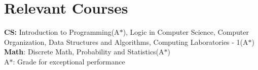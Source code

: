 \section*{Relevant Courses}

\textbf{CS:} Introduction to Programming(A$*$), Logic in Computer
Science, Computer Organization, Data Structures and Algorithms, Computing
Laboratories - 1(A$*$) \\
\textbf{Math}: Discrete Math, Probability and Statistics(A$*$)\\

{\footnotesize
    {A$*$: Grade for exceptional performance}
}
\vspace{0.5cm}

